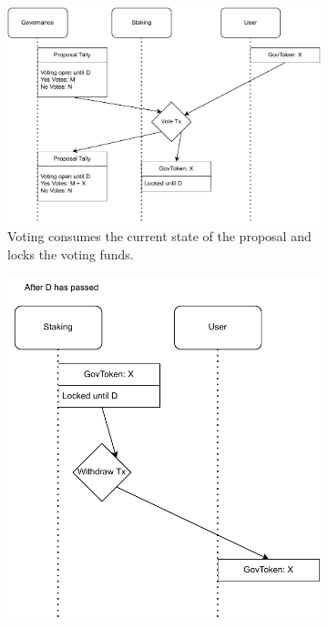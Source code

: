 \documentclass[11pt]{article}
\begin{document}
\begin{figure}
    \centering
    \begin{subfigure}[b]{0.5\textwidth}
        \centering
        \includegraphics[width=\textwidth]{figures/userflow-contracts-1.pdf}
        \caption{Voting consumes the current state of the proposal and locks the voting funds.}
        \label{fig:utxo-flow-vote}
    \end{subfigure}
    \hfill
    \begin{subfigure}[b]{0.35\textwidth}
        \centering
        \includegraphics[width=\textwidth]{figures/userflow-contracts-3.pdf}

\end{subfigure}
\end{figure}
\end{document}
